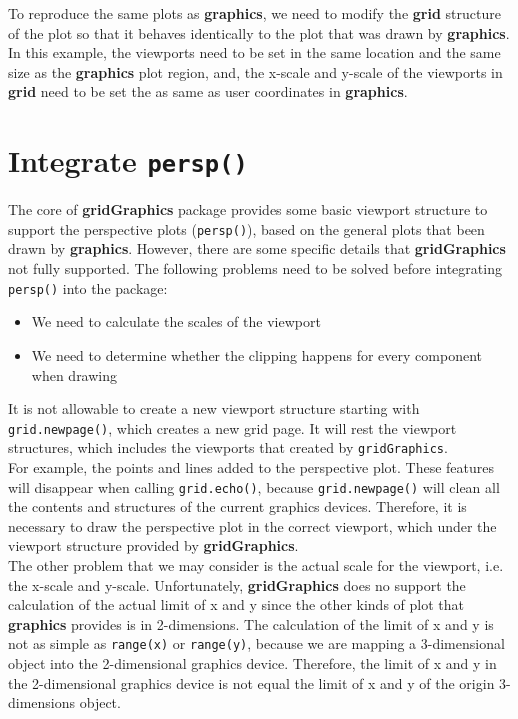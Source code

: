 \documentclass[11pt,twoside]{report}
\begin{document}
To reproduce the same plots as \textbf{graphics}, we need to modify the \textbf{grid} structure of the plot so that it behaves identically to the plot that was drawn by \textbf{graphics}. In this example, the viewports need to be set in the same location and the same size as the \textbf{graphics} plot region, and, the x-scale and y-scale of the viewports in \textbf{grid} need to be set the as same as user coordinates in \textbf{graphics}.\\

\section{Integrate \texttt{persp()}}
The core of \textbf{gridGraphics} package provides some basic viewport structure to support the perspective plots (\texttt{persp()}), based on the general plots that been drawn by \textbf{graphics}. However, there are some specific details that \textbf{gridGraphics} not fully supported.
The following problems need to be solved before integrating \texttt{persp()} into the package:
\begin{itemize}
	\item{We need to calculate the scales of the viewport}
	\item{We need to determine whether the clipping happens for every component when drawing}
\end{itemize}

It is not allowable to create a new viewport structure starting with \texttt{grid.newpage()}, which creates a new grid page. It will rest the viewport structures, which includes the viewports that created by \texttt{gridGraphics}.\\

For example, the points and lines added to the perspective plot. These features will disappear when calling \texttt{grid.echo()}, because \texttt{grid.newpage()} will clean all the contents and structures of the current graphics devices. Therefore, it is necessary to draw the perspective plot in the correct viewport, which under the viewport structure provided by \textbf{gridGraphics}.\\

The other problem that we may consider is the actual scale for the viewport, i.e. the x-scale and y-scale. Unfortunately, \textbf{gridGraphics} does no support the calculation of the actual limit of x and y since the other kinds of plot that \textbf{graphics} provides is in 2-dimensions. The calculation of the limit of x and y is not as simple as \texttt{range(x)} or \texttt{range(y)}, because we are mapping a 3-dimensional object into the 2-dimensional graphics device. Therefore, the limit of x and y in the 2-dimensional graphics device is not equal the limit of x and y of the origin 3-dimensions object.\\
\end{document}
